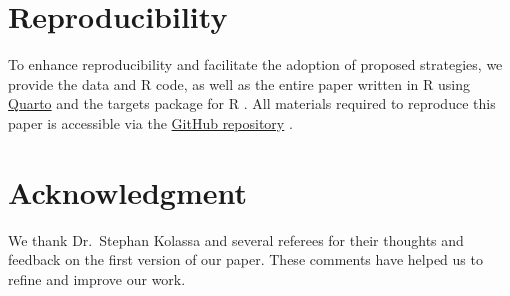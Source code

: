 \documentclass[
  11pt,
  a4paper,
]{article}
\begin{document}
\section*{Reproducibility}\label{reproducibility}

To enhance reproducibility and facilitate the adoption of proposed
strategies, we provide the data and R code, as well as the entire paper
written in R using \href{https://quarto.org/}{Quarto} and the targets
package for R \autocite{targetsr2021}. All materials required to
reproduce this paper is accessible via the
\href{https://github.com/bahmanrostamitabar/forecasting_interrupted_time_series}{GitHub
repository} .

\section*{Acknowledgment}\label{acknowledgment}

We thank Dr.~Stephan Kolassa and several referees for their thoughts and
feedback on the first version of our paper. These comments have helped
us to refine and improve our work.


\printbibliography[title=References]
\end{document}
